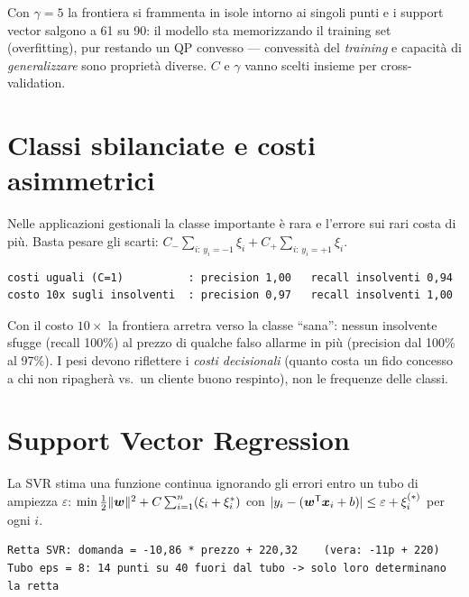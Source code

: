\begin{attenzione}
Con $\gamma = 5$ la frontiera si frammenta in isole intorno ai singoli punti e i
support vector salgono a 61 su 90: il modello sta memorizzando il training set
(overfitting), pur restando un QP convesso --- convessità del \emph{training} e
capacità di \emph{generalizzare} sono proprietà diverse. $C$ e $\gamma$ vanno scelti
insieme per cross-validation.
\end{attenzione}

\section{Classi sbilanciate e costi asimmetrici}

Nelle applicazioni gestionali la classe importante è rara e l'errore sui rari costa
di più. Basta pesare gli scarti: $C_-\!\sum_{i:\, y_i = -1}\xi_i + C_+\!\sum_{i:\, y_i=+1}\xi_i$.

\begin{lstlisting}[style=output]
costi uguali (C=1)          : precision 1,00   recall insolventi 0,94
costo 10x sugli insolventi  : precision 0,97   recall insolventi 1,00
\end{lstlisting}

\begin{insight}
Con il costo $10\times$ la frontiera arretra verso la classe ``sana'': nessun
insolvente sfugge (recall 100\%) al prezzo di qualche falso allarme in più
(precision dal 100\% al 97\%). I pesi devono riflettere i \emph{costi decisionali}
(quanto costa un fido concesso a chi non ripagherà vs.\ un cliente buono respinto),
non le frequenze delle classi.
\end{insight}

\section{Support Vector Regression}

La SVR stima una funzione continua ignorando gli errori entro un tubo di ampiezza
$\varepsilon$: $\min \tfrac12\|\boldsymbol{w}\|^2 + C\sum_{i=1}^{n} (\xi_i + \xi_i^*)$ con
$|y_i - (\boldsymbol{w}^{\mathsf T} \boldsymbol{x}_i + b)| \le \varepsilon + \xi_i^{(*)}$ per ogni $i$.

\begin{lstlisting}[style=output]
Retta SVR: domanda = -10,86 * prezzo + 220,32    (vera: -11p + 220)
Tubo eps = 8: 14 punti su 40 fuori dal tubo -> solo loro determinano la retta
\end{lstlisting}

